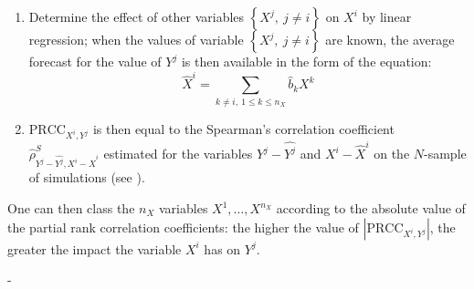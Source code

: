 {\begin{enumerate}
  \item Determine the effect of other variables $\left\{ X^j,\ j\neq i \right\}$ on $X^i$ by linear regression; when the values of variable $\left\{ X^j,\ j\neq i \right\}$ are known, the average forecast for the value of $Y^j$ is then available in the form of the equation:
    $$\widehat{X}^i = \sum_{k \neq i,\ 1 \leq k \leq n_X} \widehat{b}_k X^k $$

  \item $\textrm{PRCC}_{X^i,Y^j}$ is then equal to the Spearman's correlation coefficient $\widehat{\rho}^S_{Y^j-\widehat{Y^j},X^i-\widehat{X}^i}$  estimated for the variables  $Y^j-\widehat{Y^j}$ and $X^i-\widehat{X}^i$ on the $N$-sample of simulations (see ).
  \end{enumerate}

  One can then class the $n_X$ variables $X^1,\ldots, X^{n_X}$ according to the absolute value of the partial rank correlation coefficients: the higher the value of $\left| \textrm{PRCC}_{X^i,Y^j} \right|$, the greater the impact the variable $X^i$ has on $Y^j$.
}
{
  -
}

